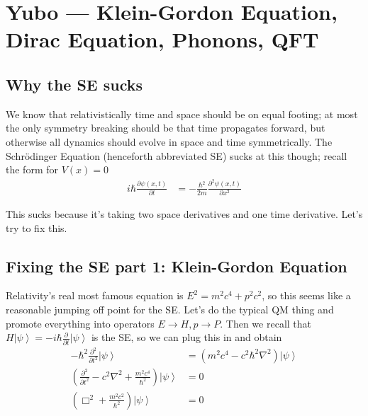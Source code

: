 \documentclass[12pt]{article}
\newcommand{\ket}[1]{\left|#1\right>}
\newcommand{\pd}[2]{\frac{\partial#1}{\partial#2}}
\newcommand{\ptd}[2]{\frac{\partial^2 #1}{\partial#2^2}}
\begin{document}
\section{Yubo --- Klein-Gordon Equation, Dirac Equation, Phonons, QFT}

\subsection{Why the SE sucks}

We know that relativistically time and space should be on equal footing; at most the only symmetry breaking should be that time propagates forward, but otherwise all dynamics should evolve in space and time symmetrically. The Schr\"odinger Equation (henceforth abbreviated SE) sucks at this though; recall the form for $V(x) = 0$
\begin{align}
    i\hbar \pd{\psi(x,t)}{t} &= -\frac{\hbar^2}{2m}\ptd{\psi(x,t)}{x}
\end{align}

This sucks because it's taking two space derivatives and one time derivative. Let's try to fix this.

\subsection{Fixing the SE part 1: Klein-Gordon Equation}

Relativity's real most famous equation is $E^2 = m^2c^4 + p^2c^2$, so this seems like a reasonable jumping off point for the SE. Let's do the typical QM thing and promote everything into operators $E \to H, p \to P$. Then we recall that $H\ket{\psi} = -i\hbar \pd{}{t}\ket{\psi}$ is the SE, so we can plug this in and obtain
\begin{align}
    -\hbar^2 \ptd{}{t}\ket{\psi} &= \left( m^2c^4 - c^2 \hbar^2 \nabla^2 \right)\ket{\psi}\\
    \left(\ptd{}{t} - c^2\nabla^2 + \frac{m^2c^4}{\hbar^2}\right)\ket{\psi} &= 0\label{KG}\\
    \left( \Box^2 + \frac{m^2c^2}{\hbar^2} \right)\ket{\psi} &= 0
\end{align}
\end{document}

